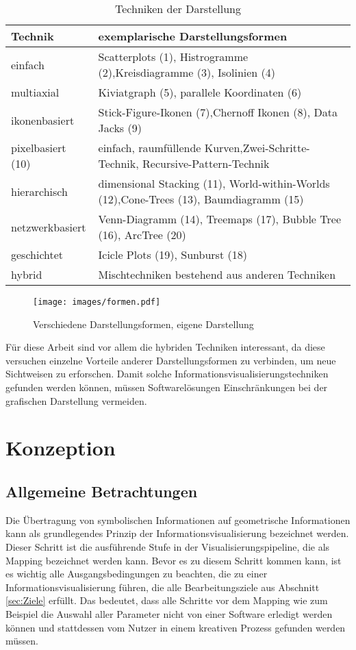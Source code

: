 \documentclass[a4paper, 12pt, DIV=calc, version=first, pdftex, headsepline, footsepline, bibtotocnumbered, liststotocnumbered]{scrreprt}
\begin{document}
\begin{table}
\centering
\begin{tabular}{|l|p{10cm}|}
\hline
\textbf{Technik} & \textbf{exemplarische Darstellungsformen}\\
\hline
einfach & Scatterplots (1), Histrogramme (2),Kreisdiagramme (3), Isolinien (4)\\
\hline
multiaxial & Kiviatgraph (5), parallele Koordinaten (6)\\
\hline
ikonenbasiert & Stick-Figure-Ikonen (7),Chernoff Ikonen (8), Data Jacks (9)\\
\hline
pixelbasiert (10) &
einfach, raumfüllende Kurven,Zwei-Schritte-Technik, Recursive-Pattern-Technik\\
\hline
hierarchisch & dimensional Stacking (11), World-within-Worlds (12),Cone-Trees (13), Baumdiagramm (15)\\
\hline
netzwerkbasiert & Venn-Diagramm (14), Treemaps (17), Bubble Tree (16), ArcTree (20)\\
\hline
geschichtet & Icicle Plots (19), Sunburst (18)\\
\hline
hybrid & Mischtechniken bestehend aus anderen Techniken\\
\hline
\end{tabular}
\caption{Techniken der Darstellung}
\label{tab:darstellungsformen}
\end{table}

\begin{figure}
\centering
\texttt{[image: images/formen.pdf]}
\caption{Verschiedene Darstellungsformen, eigene Darstellung}
\label{fig:formen}
\end{figure}

Für diese Arbeit sind vor allem die hybriden Techniken interessant, da diese versuchen
einzelne Vorteile anderer Darstellungsformen zu verbinden, um neue Sichtweisen zu erforschen.
Damit solche Informationsvisualisierungstechniken gefunden werden können, müssen
Softwarelösungen Einschränkungen bei der grafischen Darstellung vermeiden.

\chapter{Konzeption}
\label{cha:Software}
\section{Allgemeine Betrachtungen}
\label{sec:AllgemeineBetrachtungen}
Die Übertragung von symbolischen Informationen auf geometrische Informationen kann als grundlegendes Prinzip der
Informationsvisualisierung bezeichnet werden. Dieser Schritt ist die ausführende Stufe in der Visualisierungspipeline,
die als Mapping bezeichnet werden kann. Bevor es zu diesem Schritt kommen kann, ist es wichtig
alle Ausgangsbedingungen zu beachten, die zu einer Informationsvisualisierung führen, die alle Bearbeitungsziele aus
Abschnitt \ref{sec:Ziele} erfüllt. Das bedeutet, dass alle Schritte vor dem Mapping wie zum Beispiel die Auswahl
aller Parameter nicht von einer Software erledigt werden können und stattdessen vom Nutzer in einem kreativen
Prozess gefunden werden müssen.
\end{document}
